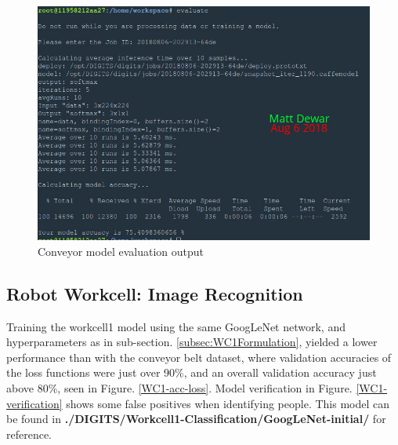 \documentclass[10pt,journal,compsoc]{IEEEtran}
\begin{document}
\begin{figure}[thpb]
  \centering
  \includegraphics[width=\linewidth]{../img/P1-Dataset/P1-Model_GooGLeNet_evaluate.jpg}
  \caption{Conveyor model evaluation output}
  \label{ConveyorEval}
\end{figure}

\subsection{Robot Workcell: Image Recognition}

Training the workcell1 model using the same GoogLeNet network, and hyperparameters as in sub-section. \ref{subsec:WC1Formulation}, yielded a lower performance than with the conveyor belt dataset, where validation accuracies of the loss functions were just over 90\%, and an overall validation accuracy just above 80\%, seen in Figure. \ref{WC1-acc-loss}. Model verification in Figure. \ref{WC1-verification} shows some false positives when identifying people. This model can be found in \textbf{ ./DIGITS/Workcell1-Classification/GoogLeNet-initial/} for reference.
\end{document}
